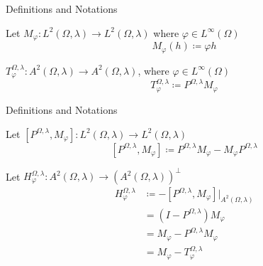 \documentclass{reu_beamer}
\begin{document}
\begin{frame}{Definitions and Notations}
\begin{definition}
    Let \(M_{\varphi}: L^2(\Omega,\lambda) \to L^2(\Omega,\lambda)\) where $\varphi \in L^{\infty}(\Omega)$
    \[M_{\varphi}(h) \coloneq \varphi h\]
\end{definition}
\begin{definition}
    $T_{\varphi}^{\Omega,\lambda}: A^2(\Omega,\lambda)\rightarrow A^2(\Omega,\lambda)$, where $\varphi\in L^{\infty}(\Omega)$
    \[T_{\varphi}^{\Omega,\lambda} \coloneq P^{\Omega,\lambda}M_{\varphi}\]
\end{definition}
\end{frame}
\begin{frame}{Definitions and Notations}
    \begin{definition}[Commutator]
        Let \(\left[P^{\Omega,\lambda},M_\varphi \right]: L^2(\Omega,\lambda) \to L^2(\Omega,\lambda)\)
        \[\left[P^{\Omega,\lambda},M_{\varphi}\right] \coloneq P^{\Omega,\lambda}M_\varphi - M_\varphi P^{\Omega,\lambda} \]
    \end{definition}
    \begin{definition}
        Let \(H^{\Omega,\lambda}_{\varphi} : A^{2}(\Omega,\lambda) \to (A^2(\Omega,\lambda))^{\perp}\)
        \begin{align*}
            H^{\Omega,\lambda}_{\varphi} &\coloneq -\left[P^{\Omega,\lambda},M_{\varphi}\right]\biggr\vert_{A^{2}(\Omega,\lambda)}\\
            &=\left(I-P^{\Omega,\lambda}\right)M_\varphi\\
            &=M_\varphi-P^{\Omega,\lambda}M_\varphi\\
            &= M_{\varphi} - T^{\Omega,\lambda}_\varphi
        \end{align*}
    \end{definition}
\end{frame}
\end{document}
